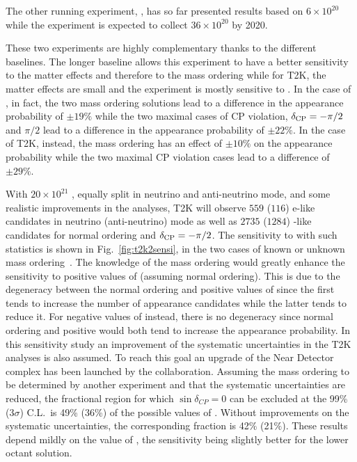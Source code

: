 The other running experiment, \nova, has so far presented results based on $6\times10^{20}$ \pot while the experiment is expected to collect $36\times10^{20}$ \pot by 2020. 

These two experiments are highly complementary thanks to the different baselines. The longer \nova baseline allows this experiment to have a better sensitivity to the matter effects and therefore to the mass ordering while for T2K, the matter effects are small and the experiment is mostly sensitive to \dcp. In the case of \nova, in fact, the two mass ordering solutions lead to a difference in the \nue appearance probability of $\pm19\%$ while the two maximal cases of CP violation, $\delta_{\mathrm{CP}}=-\pi/2$ and $\pi/2$ lead to a difference in the \nue appearance probability of $\pm22\%$. In the case of T2K, instead, the mass ordering has an effect of $\pm10\%$ on the appearance probability while the two maximal CP violation cases lead to a difference of $\pm29\%$. 

With $20\times10^{21}$ \pot, equally split in neutrino and anti-neutrino mode, and some realistic improvements in the analyses, T2K will observe $559$ ($116$) e-like candidates in neutrino (anti-neutrino) mode as well as $2735$ ($1284$) \mmu-like candidates for normal ordering and $\delta_{\mathrm{CP}}=-\pi/2$. The sensitivity to \dcp with such statistics is shown in Fig.~\ref{fig:t2k2sensi}, in the two cases of known or unknown mass ordering~\cite{Abe:2016tez}. The knowledge of the mass ordering would greatly enhance the sensitivity to positive values of \dcp (assuming normal ordering). This is due to the degeneracy between the normal ordering and positive values of \dcp since the first tends to increase the number of \nue appearance candidates while the latter tends to reduce it. For negative values of \dcp instead, there is no degeneracy since normal ordering and positive \dcp would both tend to increase the \nue appearance probability. In this sensitivity study an improvement of the systematic uncertainties in the T2K analyses is also assumed. To reach this goal an upgrade of the Near Detector complex has been launched by the collaboration. Assuming the mass ordering to be determined by another experiment and that the systematic uncertainties are reduced, the fractional region for which \(\sin\delta_{CP}=0\) can be excluded at the 99\% (3\(\sigma\)) C.L.\ is 49\% (36\%) of the possible values of \dcp. Without improvements on the systematic uncertainties, the corresponding fraction is 42$\%$ (21$\%$). These results  depend mildly on the value of \stt, the sensitivity being slightly better for the lower octant solution.


